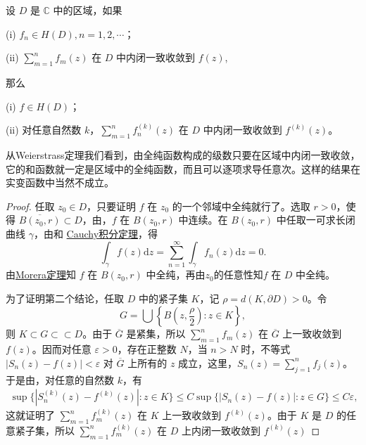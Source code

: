 \documentclass[../../main.tex]{subfiles}%
\begin{document}
\begin{theorem}[Weierstrass定理]\label{theorem:Weierstrass定理}
设 \( D \) 是 \( \mathbb{C} \) 中的区域，如果

(i) \( f_n \in H(D), n = 1, 2, \cdots \)；

(ii) \( \sum_{m=1}^{n} f_m(z) \) 在 \( D \) 中内闭一致收敛到 \( f(z) \),

那么

(i) \( f \in H(D) \)；

(ii) 对任意自然数 \( k \)，\( \sum_{m=1}^{n} f_n^{(k)}(z) \) 在 \( D \) 中内闭一致收敛到 \( f^{(k)}(z) \)。
\end{theorem}
\begin{note}
从Weierstrass定理我们看到，由全纯函数构成的级数只要在区域中内闭一致收敛，它的和函数就一定是区域中的全纯函数，而且可以逐项求导任意次。这样的结果在实变函数中当然不成立。
\end{note}
\begin{proof}
任取 \( z_0 \in D \)，只要证明 \( f \) 在 \( z_0 \) 的一个邻域中全纯就行了。选取 \( r > 0 \)，使得 \( \overline{B(z_0, r)} \subset D \)，由，\( f \) 在 \( B(z_0, r) \) 中连续。在 \( B(z_0, r) \) 中任取一可求长闭曲线 \( \gamma \)，由和 \hyperref[theorem:Cauchy-Goursat定理(Cauchy积分定理)]{Cauchy积分定理}，得
\[
\int_{\gamma} f(z) \mathrm{d}z = \sum_{n=1}^{\infty} \int_{\gamma} f_n(z) \mathrm{d}z = 0.
\]
由\hyperref[theorem:Morera定理]{Morera定理}知 \( f \) 在 \( B(z_0, r) \) 中全纯，再由$z_0$的任意性知\( f \) 在 \( D \) 中全纯。

为了证明第二个结论，任取 \( D \) 中的紧子集 \( K \)，记 \( \rho = d(K, \partial D) > 0 \)。令
\[
G = \bigcup\left\{ B\left(z, \frac{\rho}{2}\right) : z \in K \right\},
\]
则 \( K \subset G \subset\subset D \)。由于 \( \overline{G} \) 是紧集，所以 \( \sum_{m=1}^{n} f_m(z) \) 在 \( \overline{G} \) 上一致收敛到 \( f(z) \)。因而对任意 \( \varepsilon > 0 \)，存在正整数 \( N \)，当 \( n > N \) 时，不等式 \( |S_n(z) - f(z)| < \varepsilon \) 对 \( \overline{G} \) 上所有的 \( z \) 成立，这里，\( S_n(z) = \sum_{j=1}^{n} f_j(z) \)。于是由，对任意的自然数 \( k \)，有
\begin{align*}
\sup\{|S_n^{(k)}(z) - f^{(k)}(z)| : z \in K\} \leqslant C\sup\{|S_n(z) - f(z)| : z \in G\} \leqslant C\varepsilon,
\end{align*}
这就证明了 \( \sum_{m=1}^{n} f_m^{(k)}(z) \) 在 \( K \) 上一致收敛到 \( f^{(k)}(z) \)。由于 \( K \) 是 \( D \) 的任意紧子集，所以 \( \sum_{m=1}^{n} f_m^{(k)}(z) \) 在 \( D \) 上内闭一致收敛到 \( f^{(k)}(z) \)
\end{proof}
\end{document}
